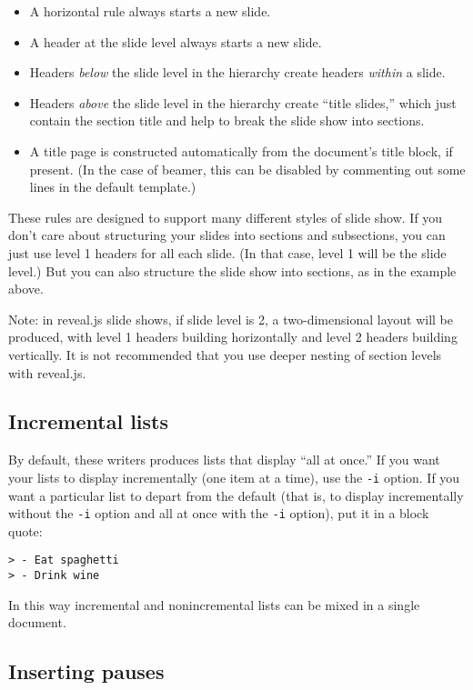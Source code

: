 \documentclass[]{article}
\begin{document}
\begin{itemize}
\item
  A horizontal rule always starts a new slide.
\item
  A header at the slide level always starts a new slide.
\item
  Headers \emph{below} the slide level in the hierarchy create headers
  \emph{within} a slide.
\item
  Headers \emph{above} the slide level in the hierarchy create ``title
  slides,'' which just contain the section title and help to break the
  slide show into sections.
\item
  A title page is constructed automatically from the document's title
  block, if present. (In the case of beamer, this can be disabled by
  commenting out some lines in the default template.)
\end{itemize}

These rules are designed to support many different styles of slide show.
If you don't care about structuring your slides into sections and
subsections, you can just use level 1 headers for all each slide. (In
that case, level 1 will be the slide level.) But you can also structure
the slide show into sections, as in the example above.

Note: in reveal.js slide shows, if slide level is 2, a two-dimensional
layout will be produced, with level 1 headers building horizontally and
level 2 headers building vertically. It is not recommended that you use
deeper nesting of section levels with reveal.js.

\subsection{Incremental lists}\label{incremental-lists}

By default, these writers produces lists that display ``all at once.''
If you want your lists to display incrementally (one item at a time),
use the \texttt{-i} option. If you want a particular list to depart from
the default (that is, to display incrementally without the \texttt{-i}
option and all at once with the \texttt{-i} option), put it in a block
quote:

\begin{verbatim}
> - Eat spaghetti
> - Drink wine
\end{verbatim}

In this way incremental and nonincremental lists can be mixed in a
single document.

\subsection{Inserting pauses}\label{inserting-pauses}
\end{document}
